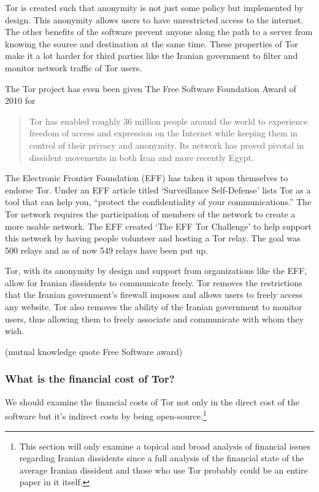 \documentclass[11pt]{article}
\begin{document}
\begin{multicols}{2}
Tor is created such that anonymity is not just some policy but implemented by
design. This anonymity allows users to have unrestricted access to the internet.
The other benefits of the software prevent anyone along the path to a server
from knowing the source and destination at the same time. These properties of
Tor make it a lot harder for third parties like the Iranian government to filter
and monitor network traffic of Tor users.

The Tor project has even been given The Free Software Foundation Award of 2010
for
\begin{quotation}Tor has enabled roughly 36 million people around the world to
  experience freedom of access and expression on the Internet while keeping them
  in control of their privacy and anonymity. Its network has proved pivotal in
  dissident movements in both Iran and more recently
Egypt.\cite{FreeSoftwareAwards} \end{quotation}

The Electronic Frontier Foundation (EFF) has taken it upon themselves to
endorse Tor. Under an EFF article titled `Surveillance Self-Defense' lists Tor
as a tool that can help you, ``protect the confidentiality of your
communications.''\cite{EFF:Tor} The Tor network requires the participation
of members of the network to create a more usable network. The EFF created `The
EFF Tor Challenge' to help support this network by having people volunteer and
hosting a Tor relay.\cite{EFF:TorChallenge} The goal was 500 relays and as of 
now 549 relays have been put up.\cite{EFF:TorChallenge}

Tor, with its anonymity by design and support from organizations like the EFF,
allow for Iranian dissidents to communicate freely. Tor removes the restrictions
that the Iranian government's firewall imposes and allows users to freely access
any website. Tor also removes the ability of the Iranian government to monitor
users, thus allowing them to freely associate and communicate with whom they
wish. 

(mutual knowledge quote Free Software award)

\subsubsection{What is the financial cost of Tor?}

We should examine the financial costs of Tor not only in the direct cost of the
software but it's indirect costs by being open-source.\footnote{This section
  will only examine a topical and broad analysis of financial issues regarding
  Iranian dissidents since a full analysis of the financial state of the average
Iranian dissident and those who use Tor probably could be an entire paper in it
itself.}


\end{multicols}
\end{document}
